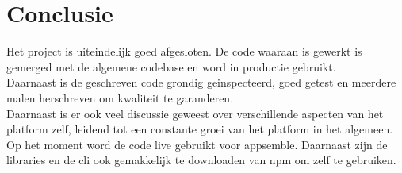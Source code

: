 \chapter{Conclusie}

Het project is uiteindelijk goed afgesloten. De code waaraan is gewerkt  is gemerged met de algemene codebase en word in productie gebruikt. \\

Daarnaast is de geschreven code grondig geinspecteerd, goed getest en meerdere malen herschreven om kwaliteit te garanderen. \\

Daarnaast is er ook veel discussie geweest over verschillende aspecten van het platform zelf, leidend tot een constante groei van het platform in het algemeen. \\

Op het moment word de code live gebruikt voor appsemble. Daarnaast zijn de libraries en de cli ook gemakkelijk te downloaden van npm om zelf te gebruiken. \\

